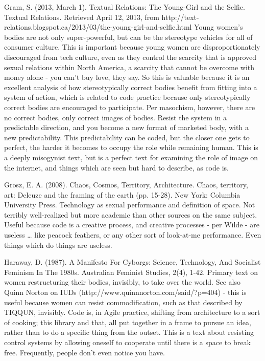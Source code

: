Gram, S. (2013, March 1). Textual Relations: The Young-Girl and the Selfie. Textual Relations. Retrieved 
	April 12, 2013, from http://text-relations.blogspot.ca/2013/03/the-young-girl-and-selfie.html
	Young women’s bodies are not only super-powerful, but can be the stereotype vehicles for all of consumer culture. This is important because young women are disproportionately discouraged from tech culture, even as they control the scarcity that is approved sexual relations within North America, a scarcity that cannot be overcome with money alone - you can’t buy love, they say. So this is valuable because it is an excellent analysis of how stereotypically correct bodies benefit from fitting into a system of action, which is related to code practice because only stereotypically correct bodies are encouraged to participate. Per masochism, however, there are no correct bodies, only correct images of bodies. Resist the system in a predictable direction, and you become a new format of marketed body, with a new predictability. This predictability can be coded, but the closer one gets to perfect, the harder it becomes to occupy the role while remaining human. This is a deeply misogynist text, but is a perfect text for examining the role of image on the internet, and things which are seen but hard to describe, as code is.
	

Grosz, E. A. (2008). Chaos, Cosmos, Territory, Architecture. Chaos, territory, art: Deleuze and the framing 
	of the earth (pp. 15-28). New York: Columbia University Press.
	Technology as sexual performance and definition of space. Not terribly well-realized but more academic than other sources on the same subject. Useful because code is a creative process, and creative processes - per Wilde - are useless … like peacock feathers, or any other sort of look-at-me performance. Even things which do things are useless.

Haraway, D. (1987). A Manifesto For Cyborgs: Science, Technology, And Socialist Feminism In The 1980s. 		Australian Feminist Studies, 2(4), 1-42.
	Primary text on women restructuring their bodies, invisibly, to take over the world. See also Quinn Norton on IUDs (http://www.quinnnorton.com/said/?p=404) - this is useful because women can resist commodification, such as that described by TIQQUN, invisibly. Code is, in Agile practice, shifting from architecture to a sort of cooking; this library and that, all put together in a frame to pursue an idea, rather than to do a specific thing from the outset. This is a text about resisting control systems by allowing oneself to cooperate until there is a space to break free. Frequently, people don’t even notice you have.

